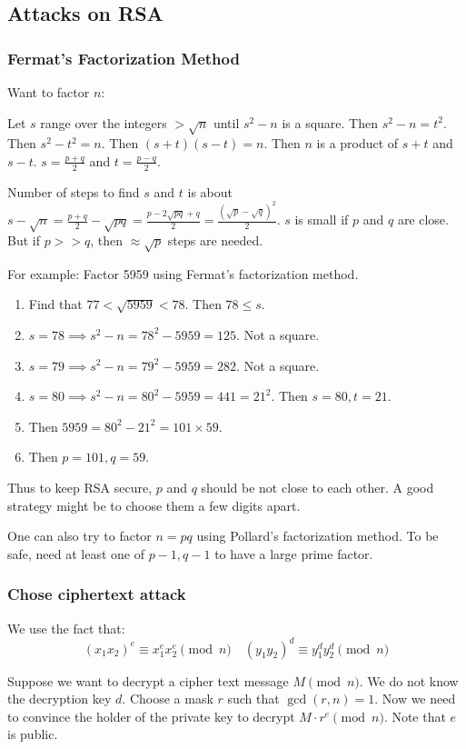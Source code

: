 \documentclass[letterpaper,12pt,oneside]{article}
\begin{document}
\subsection{Attacks on RSA}
\subsubsection{Fermat's Factorization Method}
Want to factor $n$: 

Let $s$ range over the integers $> \sqrt{n}$ until $s^2-n$ is a square. Then $s^2-n=t^2$. Then $s^2-t^2=n$. Then $(s+t)(s-t)=n$. Then $n$ is a product of $s+t$ and $s-t$. $s = \frac{p+q}{2}$ and $t = \frac{p-q}{2}$.

Number of steps to find $s$ and $t$ is about $s-\sqrt{n} = \frac{p+q}{2} - \sqrt{pq} = \frac{p-2\sqrt{pq}+q}{2} = \frac{(\sqrt{p}-\sqrt{q})^2}{2}$. $s$ is small if $p$ and $q$ are close. But if $p>>q$, then $\approx \sqrt{p}$ steps are needed.

For example: Factor 5959 using Fermat's factorization method.\begin{enumerate}
    \item Find that $77<\sqrt{5959}<78$. Then $78\leq s$.
    \item $s = 78 \implies s^2 - n = 78^2 - 5959 = 125$. Not a square.
    \item $s = 79 \implies s^2 - n = 79^2 - 5959 = 282$. Not a square.
    \item $s = 80 \implies s^2 - n = 80^2 - 5959 = 441 = 21^2$. Then $s=80, t=21$.
    \item Then $5959 = 80^2 - 21^2 = 101\times 59$.
    \item Then $p=101, q=59$.
\end{enumerate}
Thus to keep RSA secure, $p$ and $q$ should be not close to each other. A good strategy might be to choose them a few digits apart.

One can also try to factor $n=pq$ using Pollard's factorization method. To be safe, need at least one of $p-1,q-1$ to have a large prime factor.
\subsubsection{Chose ciphertext attack}
We use the fact that: \[
    (x_1 x_2)^e \equiv x_1^e x_2^e \pmod n \quad (y_1 y_2)^d \equiv y_1^d y_2^d \pmod n
\]

Suppose we want to decrypt a cipher text message $M \pmod n$. We do not know the decryption key $d$. Choose a mask $r$ such that $\gcd(r,n)=1$. Now we need to convince the holder of the private key to decrypt $M\cdot r^e \pmod n$. Note that $e$ is public.
\end{document}
